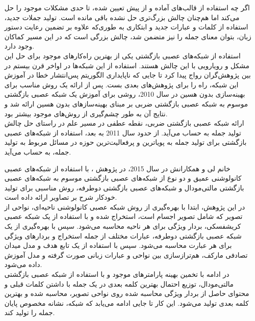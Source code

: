 \begin{enumerate}
اگر چه استفاده از قالب‌های آماده و از پیش تعیین شده، تا حدی مشکلات موجود را حل می‌کند اما هم‌چنان چالش بزرگ‌تری حل نشده باقی مانده است. تولید جملات جدید، استفاده از کلمات و عبارات جدید و ابتکاری به طوری‌که علاوه بر تضمین رعایت دستور زبان، بتوان معنای جمله را نیز متضمن شد، چالش بزرگی است که در این مسیر کماکان وجود دارد.
\\
استفاده از شبکه‌های عصبی بازگشتی یکی از بهترین راه‌کارهای موجود برای حل این مشکل و رویارویی با این چالش هستند. استفاده از این شبکه‌ها در اواخر قرن بیستم در بین پژوهش‌گران رواج پیدا کرد تا جایی که ناپایداری الگوریتم پس‌انتشار خطا در آموزش این شبکه، راه را برای پژوهش‌های بعدی بست. پس از ارائه یک روش مناسب برای بهینه‌سازی بدون هسین در سال 2010، روشی برای آموزش یک شبکه عصبی بازگشتی موسوم به شبکه عصبی بازگشتی ضربی بر مبنای بهینه‌سازهای بدون هسین ارائه شد و نتایج آن به طور چشم‌گیری از روش‌های موجود بیشتر بود.
\\
ارائه شبکه عصبی بازگشتی ضربی، نقطه عطفی در مسیر علم در راستای حل چالش تولید جمله به حساب می‌آید. از حدود سال 2011 به بعد، استفاده از شبکه‌های عصبی بازگشتی برای تولید جمله به پویاترین و پرفعالیت‌ترین حوزه در مسائل مربوط به تولید جمله، به حساب می‌آید.
\end{enumerate}

خانم لی و همکارانش در سال 2015، در پژوهش \cite{karpathy2015deep}، با استفاده از شبکه‌های عصبی کانولوشنی عمیق و دو نوع از شبکه‌های عصبی بازگشتی موسوم به شبکه‌های عصبی بازگشتی مالتی‌مودال و شبکه‌های عصبی بازگشتی دوطرفه، روش مناسبی برای تولید خودکار شرح بر تصاویر ارائه داده است.
\\
در این پژوهش، ابتدا با بهره‌گیری از روش شبکه عصبی کانولوشنی ناحیه‌ای، نواحی از تصویر که شامل تصویر اجسام است، استخراج شده و با استفاده از یک شبکه عصبی کریشفسکی، بردار ویژگی برای هر ناحیه محاسبه می‌شود. سپس با بهره‌گیری از یک شبکه عصبی بازگشتی دوطرفه، عبارات مختلف از جمله استخراج و بردارهای ویژگی برای هر عبارت محاسبه می‌شود. سپس با استفاده از یک تابع هدف و مدل میدان تصادفی مارکف، هم‌ترازسازی بین نواحی و عبارات زبانی صورت گرفته و مدل آموزش داده می‌شود.
\\
 در ادامه با تخمین بهینه پارامترهای موجود و با استفاده از شبکه عصبی بازگشتی مالتی‌مودال، توزیع احتمال بهترین کلمه بعدی در یک جمله با داشتن کلمات قبلی و محتوای حاصل از بردار ویژگی محاسبه شده روی نواحی تصویر، محاسبه شده و بهترین کلمه بعدی تولید می‌شود. این کار تا جایی ادامه می‌یابد که شبکه، نشانه مخصوص پایان جمله را تولید کند.
  